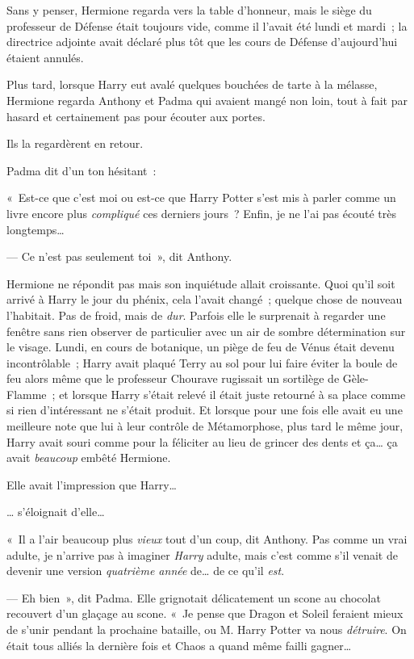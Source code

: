 Sans y penser, Hermione regarda vers la table d'honneur, mais le siège du professeur de Défense était toujours vide, comme il l'avait été lundi et mardi~; la directrice adjointe avait déclaré plus tôt que les cours de Défense d'aujourd'hui étaient annulés.

Plus tard, lorsque Harry eut avalé quelques bouchées de tarte à la mélasse, Hermione regarda Anthony et Padma qui avaient mangé non loin, tout à fait par hasard et certainement pas pour écouter aux portes.

Ils la regardèrent en retour.

Padma dit d'un ton hésitant~:

«~Est-ce que c'est moi ou est-ce que Harry Potter s'est mis à parler comme un livre encore plus \emph{compliqué} ces derniers jours~?
Enfin, je ne l'ai pas écouté très longtemps…

--- Ce n'est pas seulement toi~», dit Anthony.

Hermione ne répondit pas mais son inquiétude allait croissante.
Quoi qu'il soit arrivé à Harry le jour du phénix, cela l'avait changé~; quelque chose de nouveau l'habitait.
Pas de froid, mais de \emph{dur}.
Parfois elle le surprenait à regarder une fenêtre sans rien observer de particulier avec un air de sombre détermination sur le visage.
Lundi, en cours de botanique, un piège de feu de Vénus était devenu incontrôlable~; Harry avait plaqué Terry au sol pour lui faire éviter la boule de feu alors même que le professeur Chourave rugissait un sortilège de Gèle-Flamme~; et lorsque Harry s'était relevé il était juste retourné à sa place comme si rien d'intéressant ne s'était produit.
Et lorsque pour une fois elle avait eu une meilleure note que lui à leur contrôle de Métamorphose, plus tard le même jour, Harry avait souri comme pour la féliciter au lieu de grincer des dents et ça… ça avait \emph{beaucoup} embêté Hermione.

Elle avait l'impression que Harry…

… s'éloignait d'elle…

«~Il a l'air beaucoup plus \emph{vieux} tout d'un coup, dit Anthony.
Pas comme un vrai adulte, je n'arrive pas à imaginer \emph{Harry} adulte, mais c'est comme s'il venait de devenir une version \emph{quatrième année} de… de ce qu'il \emph{est}.

--- Eh bien~», dit Padma.
Elle grignotait délicatement un scone au chocolat recouvert d'un glaçage au scone.
«~Je pense que Dragon et Soleil feraient mieux de s'unir pendant la prochaine bataille, ou M. Harry Potter va nous \emph{détruire}.
On était tous alliés la dernière fois et Chaos a quand même failli gagner…

